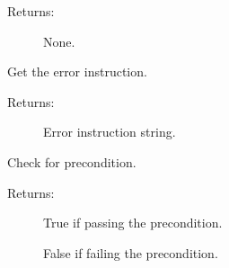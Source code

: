 \documentclass[letterpaper,10pt,english]{sphinxmanual}
\begin{document}
\begin{fulllineitems}
\begin{fulllineitems}
\begin{description}
\item[{Returns:}] \leavevmode
\sphinxAtStartPar
None.

\end{description}

\end{fulllineitems}


\begin{fulllineitems}
\label{\detokenize{QConnectionLibrary:QConnectionLibrary.connection_base.ConnectionBase.error_instruction}}
\sphinxAtStartPar
Get the error instruction.
\begin{description}
\item[{Returns:}] \leavevmode
\sphinxAtStartPar
Error instruction string.

\end{description}

\end{fulllineitems}


\begin{fulllineitems}
\label{\detokenize{QConnectionLibrary:QConnectionLibrary.connection_base.ConnectionBase.is_precondition_pass}}
\sphinxAtStartPar
Check for precondition.
\begin{description}
\item[{Returns:}] \leavevmode
\sphinxAtStartPar
True if passing the precondition.

\sphinxAtStartPar
False if failing the precondition.

\end{description}

\end{fulllineitems}



\end{fulllineitems}
\end{document}
